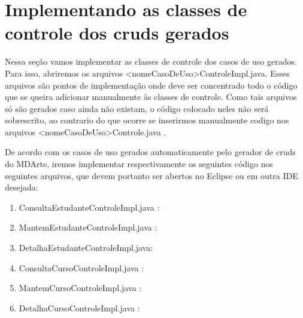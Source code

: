 \section{Implementando as classes de controle dos cruds gerados}

Nessa seção vamos implementar as classes de controle dos casos de uso gerados. Para isso, abriremos os arquivos <nomeCasoDeUso>ControleImpl.java. Esses arquivos são pontos de implementação onde deve ser concentrado todo o código que se queira adicionar manualmente às classes de controle. Como tais arquivos só são gerados caso ainda não existam, o código colocado neles não será sobrescrito, ao contrario do que ocorre se inserirmos manualmente codigo nos arquivos <nomeCasoDeUso>Controle.java .

De acordo com os casos de uso gerados automaticamente pelo gerador de cruds do MDArte, iremos implementar respectivamente os seguintes código nos seguintes arquivos, que devem portanto ser abertos no Eclipse ou em outra IDE desejada:

\begin{enumerate}
\item ConsultaEstudanteControleImpl.java :
\begin{framed}
	
\end{framed}
		
\item MantemEstudanteControleImpl.java :
\begin{framed}
	
\end{framed}

\item DetalhaEstudanteControleImpl.java:
\begin{framed}
	
\end{framed}

\item ConsultaCursoControleImpl.java :
\begin{framed}
	
\end{framed}

\item MantemCursoControleImpl.java :
\begin{framed}
	
\end{framed}

\item DetalhaCursoControleImpl.java :
\begin{framed}
	
\end{framed}

\end{enumerate}

